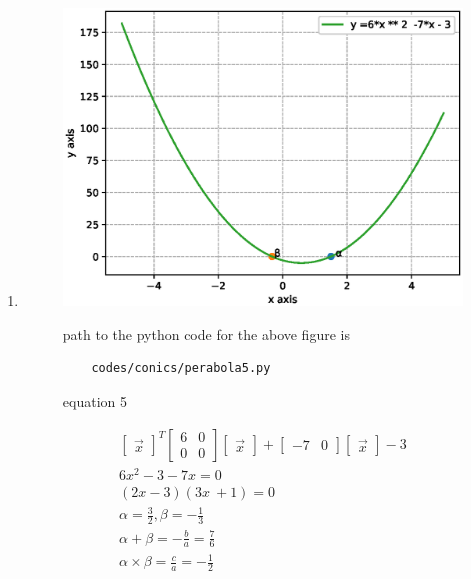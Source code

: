 \begin{enumerate}[label=\arabic*.,ref=\thesubsection.\theenumi]
\item
\begin{figure}[!ht]
	\centering
	\includegraphics[width=\columnwidth]{./figures/conics/perabola5.eps}
	\caption{equation 5 }
	\label{fig:perabola5}
	path to the python code for the above figure is 
	\begin{lstlisting}
	codes/conics/perabola5.py
	\end{lstlisting}
\end{figure}
\begin{align}
\begin{bmatrix}\vec x\end{bmatrix}^T\begin{bmatrix}6 & 0\\0 & 0\end{bmatrix}\begin{bmatrix}\vec x\end{bmatrix} + \begin{bmatrix}-7 & 0\end{bmatrix}\begin{bmatrix}\vec x\end{bmatrix} -3
\\
6x^2-3-7x = 0
\\
\left(2x - 3\right)\left(3x\ + 1\right) = 0
\\
\alpha = \frac{3}{2},\beta =-\frac{1}{3}
\\
\alpha +\beta = -\frac{b}{a} = \frac{7}{6}
\\
\alpha \times \beta = \frac{c}{a} = -\frac{1}{2}
\end{align}
	



\end{enumerate}
